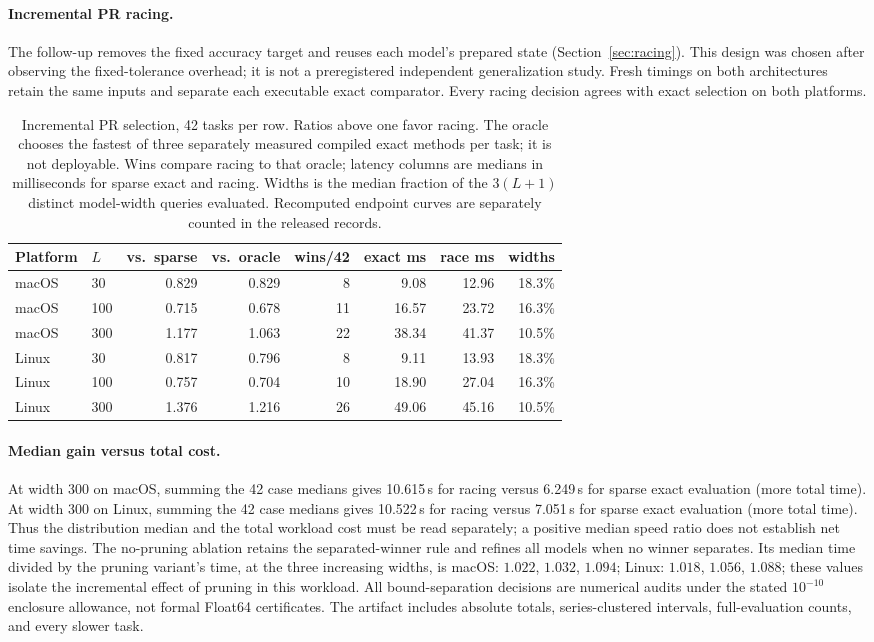 {\paragraph{Incremental PR racing.}
The follow-up removes the fixed accuracy target and reuses each model's
prepared state (Section~\ref{sec:racing}). This design was chosen after
observing the fixed-tolerance overhead; it is not a preregistered
independent generalization study. Fresh timings on both architectures
retain the same inputs and separate each executable exact comparator.
Every racing decision agrees with exact selection on both platforms.
\begin{table}[t]\centering
\begin{tabular}{llrrrrrr}\toprule
Platform & $L$ & vs.\ sparse & vs.\ oracle & wins/42 & exact ms & race ms & widths \\\midrule
macOS & 30 & 0.829 & 0.829 & 8 & 9.08 & 12.96 & 18.3\% \\
macOS & 100 & 0.715 & 0.678 & 11 & 16.57 & 23.72 & 16.3\% \\
macOS & 300 & 1.177 & 1.063 & 22 & 38.34 & 41.37 & 10.5\% \\
Linux & 30 & 0.817 & 0.796 & 8 & 9.11 & 13.93 & 18.3\% \\
Linux & 100 & 0.757 & 0.704 & 10 & 18.90 & 27.04 & 16.3\% \\
Linux & 300 & 1.376 & 1.216 & 26 & 49.06 & 45.16 & 10.5\% \\
\bottomrule\end{tabular}
\caption{Incremental PR selection, 42 tasks per row. Ratios above one
favor racing. The oracle chooses the fastest of three separately
measured compiled exact methods per task; it is not deployable.
Wins compare racing to that oracle; latency columns are medians in
milliseconds for sparse exact and racing. Widths is the median fraction
of the $3(L+1)$ distinct model-width queries evaluated. Recomputed
endpoint curves are separately counted in the released records.}
\label{tab:selection}\end{table}
\paragraph{Median gain versus total cost.}
At width 300 on macOS, summing the 42 case medians gives 10.615\,s for racing versus 6.249\,s for sparse exact evaluation (more total time).
At width 300 on Linux, summing the 42 case medians gives 10.522\,s for racing versus 7.051\,s for sparse exact evaluation (more total time).
Thus the distribution median and the total workload cost must be read separately; a positive median speed ratio does not establish net time savings.
The no-pruning ablation retains the separated-winner rule and refines
all models when no winner separates. Its median time divided by the
pruning variant's time, at the three increasing widths, is
macOS: $1.022$, $1.032$, $1.094$;
Linux: $1.018$, $1.056$, $1.088$;
these values isolate the incremental effect of pruning in this workload.
All bound-separation decisions are numerical audits under the stated
$10^{-10}$ enclosure allowance, not formal Float64 certificates.
The artifact includes absolute totals, series-clustered intervals,
full-evaluation counts, and every slower task.
}{}

